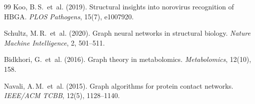 ﻿\documentclass[a4paper,12pt]{article}
\theoremstyle{plain}
\theoremstyle{definition}
\theoremstyle{remark}
\begin{document}
\begin{thebibliography}{99}
Koo, B.\,S.\ et~al. (2019).
Structural insights into norovirus recognition of HBGA.
\emph{PLOS Pathogens}, 15(7), e1007920.

Schultz, M.\,R.\ et~al. (2020).
Graph neural networks in structural biology.
\emph{Nature Machine Intelligence}, 2, 501--511.

Bidkhori, G.\ et~al. (2016).
Graph theory in metabolomics.
\emph{Metabolomics}, 12(10), 158.

Navali, A.\,M.\ et~al. (2015).
Graph algorithms for protein contact networks.
\emph{IEEE/ACM TCBB}, 12(5), 1128--1140.

\end{thebibliography}
\end{document}
